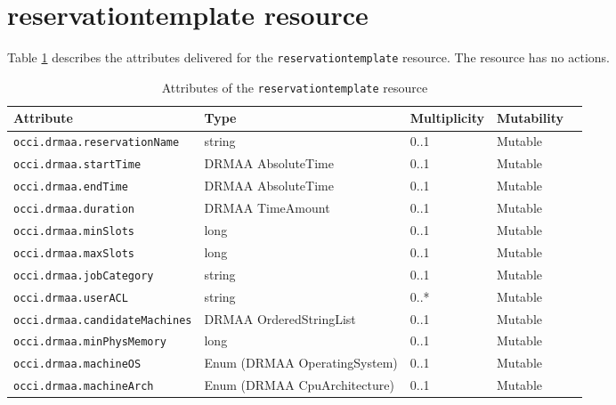 \documentclass[10pt]{article}
\newcommand{\h}[1]{\lstinline|#1|}
\begin{document}
\section{reservationtemplate resource}
Table \ref{tab:reservationtemplateattributes} describes the attributes delivered for the \h{reservationtemplate} resource. The resource has no actions.

\begin{table}[ht]
\centering
\begin{tabularx}{\textwidth}{|l|l|X|l|l|}
\hline 
Attribute           & Type                         & Multiplicity & Mutability \\
\hline
\h{occi.drmaa.reservationName}     & string                       & 0..1         & Mutable   \\
\h{occi.drmaa.startTime}           & DRMAA AbsoluteTime                 & 0..1         & Mutable   \\
\h{occi.drmaa.endTime}             & DRMAA AbsoluteTime                 & 0..1         & Mutable   \\
\h{occi.drmaa.duration}            & DRMAA TimeAmount                   & 0..1         & Mutable   \\
\h{occi.drmaa.minSlots}            & long                         & 0..1         & Mutable   \\ 
\h{occi.drmaa.maxSlots}            & long                         & 0..1         & Mutable   \\ 
\h{occi.drmaa.jobCategory}         & string                       & 0..1         & Mutable   \\
\h{occi.drmaa.userACL}             & string                       & 0..*         & Mutable   \\
\h{occi.drmaa.candidateMachines}   & DRMAA OrderedStringList            & 0..1         & Mutable   \\ 
\h{occi.drmaa.minPhysMemory}       & long                         & 0..1         & Mutable   \\ 
\h{occi.drmaa.machineOS}           & Enum (DRMAA OperatingSystem)       & 0..1         & Mutable   \\
\h{occi.drmaa.machineArch}         & Enum (DRMAA CpuArchitecture)       & 0..1         & Mutable   \\
\hline
\end{tabularx}
\caption{Attributes of the \h{reservationtemplate} resource}
\label{tab:reservationtemplateattributes}
\end{table}
\end{document}
